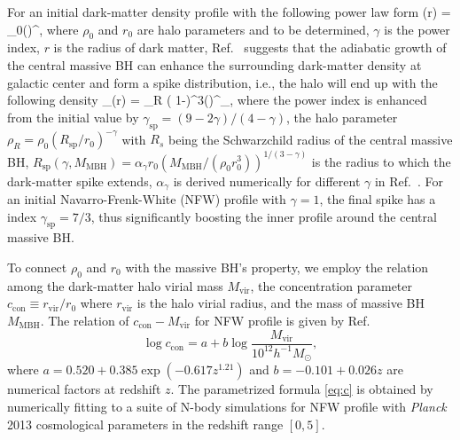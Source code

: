 For an initial dark-matter density profile with the following power law form
\be\label{Eq:powerindex}
\rho(r) = \rho_0\left(\right)^{\gamma},
\ee
where $\rho_0$ and $r_0$ are halo parameters and to be determined, $\gamma$ is the power index, $r$ is the radius of dark matter, Ref.~\cite{PhysRevLett.83.1719} suggests that the adiabatic growth of  the central massive \ac{BH} can enhance the surrounding dark-matter density at galactic center and form a spike distribution, i.e., the halo will end up with the following density \cite{PhysRevLett.83.1719,Nishikawa:2017chy}
\be \label{eq:spike}
\rho_(r) = \rho_R \left( 1-\right)^3\left(\right)^{\gamma_},
\ee 
where the power index is enhanced from the initial value by $\gamma_\text{sp} = (9-2\gamma)/(4-\gamma)$, the halo parameter $\rho_R = \rho_0(R_\text{sp}/r_0)^{-\gamma}$ with $R_s$ being the Schwarzchild radius of the central massive \ac{BH}, $R_\text{sp}(\gamma,M_\text{MBH}) = \alpha_\gamma r_0(M_\text{MBH}/(\rho_0 r_0^3))^{1/(3-\gamma)}$ is the radius to which the dark-matter spike extends, $\alpha_\gamma$ is derived numerically for different $\gamma$ in Ref.~\cite{PhysRevLett.83.1719}. 
For an initial Navarro-Frenk-White (NFW) profile \cite{NFW} with $\gamma=1$, the final spike has a index $\gamma_{\textrm{sp}}=7/3$, thus significantly boosting the inner profile around the central massive \ac{BH}.

To connect $\rho_0$ and $r_0$ with the massive \ac{BH}'s property, we employ the relation among the dark-matter halo virial mass $M_\text{vir}$, the concentration parameter $c_\text{con}\equiv r_\text{vir}/r_0$ where $r_\text{vir}$ is the halo virial radius, and the mass of massive \ac{BH} $M_\text{MBH}$. 
The relation of $c_\text{con}-M_\text{vir}$ for NFW profile is given by Ref. \cite{Dutton:2014xda}
\begin{equation}\label{eq:c}
\log {c_\text{con}} = a + b \log{ \frac{M_\text{vir}}{10^{12}h^{-1}M_\odot}    },
\end{equation}
where $a = 0.520+0.385\exp(-0.617z^{1.21})$ and $b = -0.101 + 0.026z$ are numerical factors at redshift $z$.
The parametrized formula \cref{eq:c} is obtained by numerically fitting to a suite of N-body simulations for NFW profile with \textit{Planck} 2013 cosmological parameters \cite{Planck2013} in the redshift range $[0,5]$.

